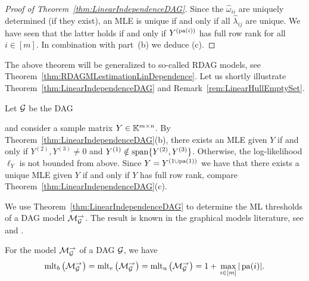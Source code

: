 \begin{proof}[Proof of Theorem~\ref{thm:LinearIndependenceDAG}]
	Since the $\hat{\omega}_{ii}$ are uniquely determined (if they exist), an MLE is unique if and only if all $\hat{\lambda}_{ij}$ are unique. We have seen that the latter holds if and only if $Y^{(\operatorname{pa}(i))}$ has full row rank for all $i \in [m]$. In combination with part~(b) we deduce (c).
\end{proof}

The above theorem will be generalized to so-called RDAG models, see Theorem~\ref{thm:RDAGMLestimationLinDependence}.
Let us shortly illustrate Theorem~\ref{thm:LinearIndependenceDAG} and Remark~\ref{rem:LinearHullEmptySet}.

\begin{example}\label{ex:DAGLinearDependence}
	Let $\mathcal{G}$ be the DAG
	and consider a sample matrix $Y \in \mathbb K^{m \times n}$. By Theorem~\ref{thm:LinearIndependenceDAG}(b), there exists an MLE given $Y$ if and only if $Y^{(2)}, Y^{(3)} \neq 0$ and $Y^{(1)} \notin \operatorname{span} \{Y^{(2)}, Y^{(3)}\}$. Otherwise, the log-likelihood $\ell_Y$ is not bounded from above. Since $Y = Y^{(1 \cup \operatorname{pa}(1))}$ we have that there exists a unique MLE given $Y$ if and only if $Y$ has full row rank, compare Theorem~\ref{thm:LinearIndependenceDAG}(c).
	\hfill\exSymbol
\end{example}

We use Theorem~\ref{thm:LinearIndependenceDAG} to determine the ML thresholds of a DAG model $\mathcal{M}_{\mathcal{G}}^{\to}$. The result is known in the graphical models literature, see \cite[Section 5.4.1]{LauritzenBook} and \cite[Theorem~1]{drton2019maximum}.

\begin{cor} \label{cor:MLthresholdsDAG}
	For the model $\mathcal{M}_{\mathcal{G}}^{\to}$ of a DAG $\mathcal{G}$, we have
	\[ \operatorname{mlt}_b \big( \mathcal{M}_{\mathcal{G}}^{\to} \big) = \operatorname{mlt}_e \big( \mathcal{M}_{\mathcal{G}}^{\to} \big) = \operatorname{mlt}_u \big( \mathcal{M}_{\mathcal{G}}^{\to} \big) = 1 + \, \max_{i \in [m]} |\operatorname{pa}(i)| . \]
\end{cor}


